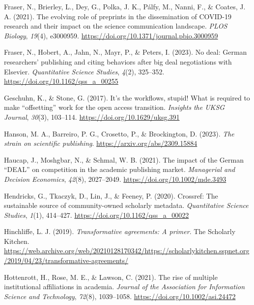 \documentclass[a4paper,man,floatsintext,longtable,noextraspace,12pt]{apa6}
\newenvironment{CSLReferences}%
  {}%
  {\par}
\begin{document}
\begin{CSLReferences}{1}{0}
\leavevmode{}%
Fraser, N., Brierley, L., Dey, G., Polka, J. K., Pálfy, M., Nanni, F.,
\& Coates, J. A. (2021). The evolving role of preprints in the
dissemination of COVID-19 research and their impact on the science
communication landscape. \emph{PLOS Biology}, \emph{19}(4), e3000959.
\url{https://doi.org/10.1371/journal.pbio.3000959}

\leavevmode{}%
Fraser, N., Hobert, A., Jahn, N., Mayr, P., \& Peters, I. (2023). No
deal: German researchers' publishing and citing behaviors after big deal
negotiations with {Elsevier}. \emph{Quantitative Science Studies},
\emph{4}(2), 325--352. \url{https://doi.org/10.1162/qss_a_00255}

\leavevmode{}%
Geschuhn, K., \& Stone, G. (2017). It's the workflows, stupid! What is
required to make {``offsetting''} work for the open access transition.
\emph{Insights the {UKSG} Journal}, \emph{30}(3), 103--114.
\url{https://doi.org/10.1629/uksg.391}

\leavevmode{}%
Hanson, M. A., Barreiro, P. G., Crosetto, P., \& Brockington, D. (2023).
\emph{The strain on scientific publishing}.
\url{https://arxiv.org/abs/2309.15884}

\leavevmode{}%
Haucap, J., Moshgbar, N., \& Schmal, W. B. (2021). The impact of the
{German {``DEAL''}} on competition in the academic publishing market.
\emph{Managerial and Decision Economics}, \emph{42}(8), 2027--2049.
\url{https://doi.org/10.1002/mde.3493}

\leavevmode{}%
Hendricks, G., Tkaczyk, D., Lin, J., \& Feeney, P. (2020). Crossref: The
sustainable source of community-owned scholarly metadata.
\emph{Quantitative Science Studies}, \emph{1}(1), 414--427.
\url{https://doi.org/10.1162/qss_a_00022}

\leavevmode{}%
Hinchliffe, L. J. (2019). \emph{Transformative agreements: A primer}.
The Scholarly Kitchen.
\url{https://web.archive.org/web/20210128170342/https://scholarlykitchen.sspnet.org/2019/04/23/transformative-agreements/}

\leavevmode{}%
Hottenrott, H., Rose, M. E., \& Lawson, C. (2021). The rise of multiple
institutional affiliations in academia. \emph{Journal of the Association
for Information Science and Technology}, \emph{72}(8), 1039--1058.
\url{https://doi.org/10.1002/asi.24472}


\end{CSLReferences}
\end{document}
